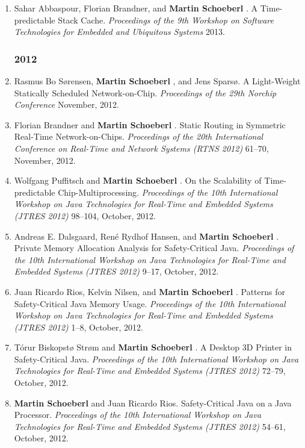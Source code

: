\begin{enumerate}
\item Sahar Abbaspour, Florian Brandner, and {\bf Martin Schoeberl }.
 A Time-predictable Stack Cache.
 \emph{Proceedings of the 9th Workshop on Software Technologies for Embedded and Ubiquitous Systems} 2013.


\subsubsection*{2012}

\item Rasmus Bo S{\o}rensen, {\bf Martin Schoeberl }, and Jens Spars{\o}.
 A Light-Weight Statically Scheduled Network-on-Chip.
 \emph{Proceedings of the 29th Norchip Conference} November, 2012.

\item Florian Brandner and {\bf Martin Schoeberl }.
 Static Routing in Symmetric Real-Time Network-on-Chips.
 \emph{Proceedings of the 20th International Conference on Real-Time and Network Systems (RTNS 2012)} 61--70, November, 2012.

\item Wolfgang Puffitsch and {\bf Martin Schoeberl }.
 On the Scalability of Time-predictable Chip-Multiprocessing.
 \emph{Proceedings of the 10th International Workshop on Java Technologies for Real-Time and Embedded Systems (JTRES 2012)} 98--104, October, 2012.

\item Andreas E. Dalsgaard, Ren\'{e} Rydhof Hansen, and {\bf Martin Schoeberl }.
 Private Memory Allocation Analysis for Safety-Critical Java.
 \emph{Proceedings of the 10th International Workshop on Java Technologies for Real-Time and Embedded Systems (JTRES 2012)} 9--17, October, 2012.

\item Juan Ricardo Rios, Kelvin Nilsen, and {\bf Martin Schoeberl }.
 Patterns for Safety-Critical Java Memory Usage.
 \emph{Proceedings of the 10th International Workshop on Java Technologies for Real-Time and Embedded Systems (JTRES 2012)} 1--8, October, 2012.

\item T{\'o}rur Biskopst{\o} Str{\o}m and {\bf Martin Schoeberl }.
 A Desktop 3D Printer in Safety-Critical Java.
 \emph{Proceedings of the 10th International Workshop on Java Technologies for Real-Time and Embedded Systems (JTRES 2012)} 72--79, October, 2012.

\item {\bf Martin Schoeberl } and Juan Ricardo Rios.
 Safety-Critical Java on a Java Processor.
 \emph{Proceedings of the 10th International Workshop on Java Technologies for Real-Time and Embedded Systems (JTRES 2012)} 54--61, October, 2012.


\end{enumerate}
